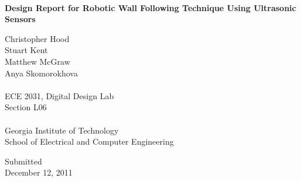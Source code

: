 \begin{titlepage}
\center

\hspace{0.5in}\\

\huge
\textbf{Design Report for Robotic Wall Following Technique Using Ultrasonic Sensors}\\

\vspace{0.75in}

\LARGE
Christopher Hood\\
Stuart Kent\\
Matthew McGraw\\
Anya Skomorokhova\\
\hspace{1in}\\


ECE 2031, Digital Design Lab\\
Section L06\\
\hspace{1in}\\

\Large
Georgia Institute of Technology\\
School of Electrical and Computer Engineering\\

\vspace{1in}

\large 
Submitted\\
December 12, 2011\\

\end{titlepage}
